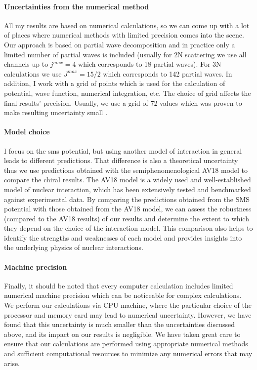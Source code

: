     \paragraph{Uncertainties from the numerical method}
    All my results are based on numerical calculations,
    so we can come up with a lot of places where numerical methods with limited 
    precision comes into the scene. 
    Our approach is based on partial wave decomposition 
    and in practice only a limited number of partial waves is included 
    (usually for 2N scattering we use all channels up to $j^{max}=4$ which corresponds to 18 partial waves).
    For 3N calculations we use $J^{max}=15/2$ which corresponds to 142 partial waves.
    In addition, I work with a grid of points which is used for the calculation of potential, wave function, numerical integration, etc. 
    The choice of grid affects the final results' precision. 
    Usually, we use a grid of 72 values which was proven to make resulting
    uncertainty small \cite{Glockle1983}.

    \paragraph{Model choice}
    I focus on the \gls{sms} potential, but using another model of interaction 
    in general leads to different predictions. That difference is also a theoretical uncertainty thus
    we use predictions obtained with the semiphenomenological AV18 model to compare the chiral results.
    The AV18 model is a widely used and well-established model of nuclear interaction,
    which has been extensively tested and benchmarked against experimental data. By comparing
    the predictions obtained from the SMS potential with those obtained from the AV18 model,
    we can assess the robustness (compared to the AV18 results) of our results and determine the extent to which they depend
    on the choice of the interaction model. This comparison also helps to identify the strengths
    and weaknesses of each model and provides insights into the underlying physics of nuclear interactions.

    \paragraph{Machine precision}

    Finally, it should be noted that every computer calculation includes limited numerical machine precision which
    can be noticeable for complex calculations. We perform our calculations via CPU machine, where the particular
    choice of the processor and memory card may lead to numerical uncertainty. However, we have found that this
    uncertainty is much smaller than the uncertainties discussed above, and its impact on our results is
    negligible. We have taken great care to ensure that our calculations are performed using appropriate numerical
    methods and sufficient computational resources to minimize any numerical errors that may arise. 

